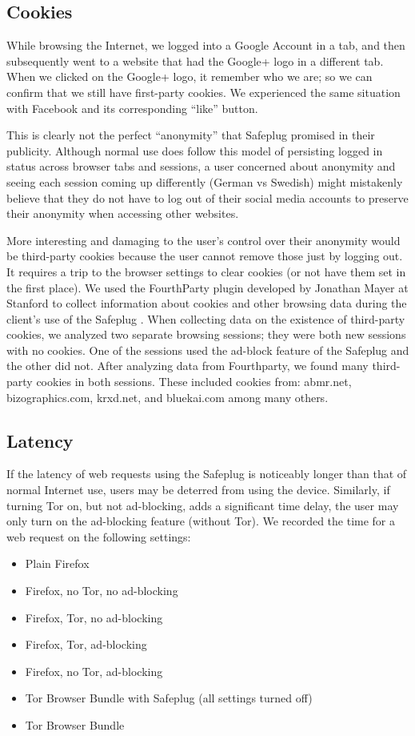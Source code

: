 \documentclass[conference]{IEEEtran}
\begin{document}
\subsection{Cookies}  
While browsing the Internet, we logged into a Google Account in a tab, and then subsequently went to a website that had the Google+ logo in a different tab.  When we clicked on the Google+ logo, it remember who we are; so we can confirm that we still have first-party cookies.  We experienced the same situation with Facebook and its corresponding ``like'' button.

This is clearly not the perfect ``anonymity'' that Safeplug promised in their publicity.  Although normal use does follow this model of persisting logged in status across browser tabs and sessions, a user concerned about anonymity and seeing each session coming up differently (German vs Swedish) might mistakenly believe that they do not have to log out of their social media accounts to preserve their anonymity when accessing other websites.

More interesting and damaging to the user's control over their anonymity would be third-party cookies because the user cannot remove those just by logging out.  It requires a trip to the browser settings to clear cookies (or not have them set in the first place).  We used the FourthParty plugin developed by Jonathan Mayer at Stanford to collect information about cookies and other browsing data during the client's use of the Safeplug \cite{fourthparty}.  When collecting data on the existence of third-party cookies, we analyzed two separate browsing sessions; they were both new sessions with no cookies.  One of the sessions used the ad-block feature of the Safeplug and the other did not.  After analyzing data from Fourthparty, we found many third-party cookies in both sessions.  These included cookies from: abmr.net, bizographics.com, krxd.net, and bluekai.com among many others.

\subsection{Latency}
If the latency of web requests using the Safeplug is noticeably longer than that of normal Internet use, users may be deterred from using the device.  Similarly, if turning Tor on, but not ad-blocking, adds a significant time delay, the user may only turn on the ad-blocking feature (without Tor).  We recorded the time for a web request on the following settings:

\begin{itemize}
\item Plain Firefox
\item Firefox, no Tor, no ad-blocking
\item Firefox, Tor, no ad-blocking
\item Firefox, Tor, ad-blocking
\item Firefox, no Tor, ad-blocking
\item Tor Browser Bundle with Safeplug (all settings turned off)
\item Tor Browser Bundle
\end{itemize}
\end{document}
